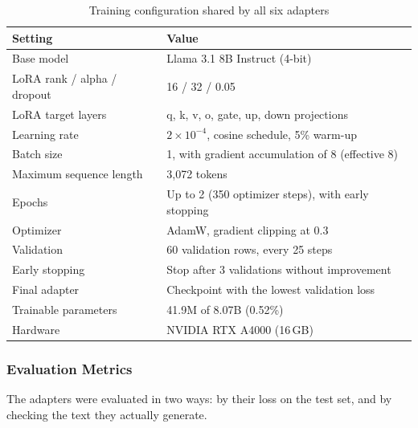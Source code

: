 \documentclass{FastFyp}
\begin{document}
\begin{table}[H]
\centering
\caption{Training configuration shared by all six adapters}
\label{tab:train-config}
\small
\begin{tabular}{|l|l|}
\hline
\textbf{Setting} & \textbf{Value} \\ \hline
Base model & Llama 3.1 8B Instruct (4-bit) \\ \hline
LoRA rank / alpha / dropout & 16 / 32 / 0.05 \\ \hline
LoRA target layers & q, k, v, o, gate, up, down projections \\ \hline
Learning rate & $2\times10^{-4}$, cosine schedule, 5\% warm-up \\ \hline
Batch size & 1, with gradient accumulation of 8 (effective 8) \\ \hline
Maximum sequence length & 3,072 tokens \\ \hline
Epochs & Up to 2 (350 optimizer steps), with early stopping \\ \hline
Optimizer & AdamW, gradient clipping at 0.3 \\ \hline
Validation & 60 validation rows, every 25 steps \\ \hline
Early stopping & Stop after 3 validations without improvement \\ \hline
Final adapter & Checkpoint with the lowest validation loss \\ \hline
Trainable parameters & 41.9M of 8.07B (0.52\%) \\ \hline
Hardware & NVIDIA RTX A4000 (16\,GB) \\ \hline
\end{tabular}
\end{table}

\subsubsection{Evaluation Metrics}
The adapters were evaluated in two ways: by their loss on the test set, and by checking the text they actually generate.
\end{document}
